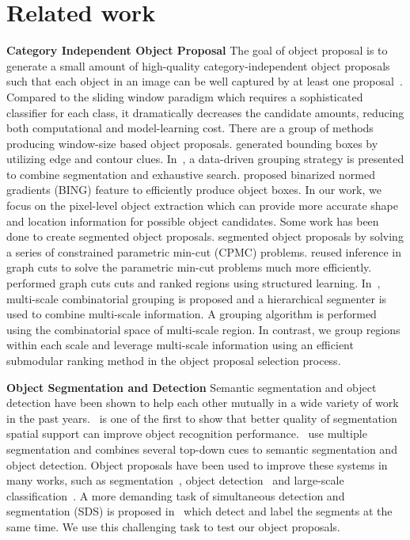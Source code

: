 \documentclass[10pt,twocolumn,letterpaper]{article}
\begin{document}
\section{Related work}
{\bf Category Independent Object Proposal} The goal of object proposal is to generate a small amount of high-quality category-independent object proposals such that each object in an image can be well captured by at least one proposal~\cite{Alexe12, Endres14}. Compared to the sliding window paradigm which requires a sophisticated classifier for each class, it dramatically decreases the candidate amounts, reducing both computational and model-learning cost. There are a group of methods producing window-size based object proposals. \cite{Zitnick14} generated bounding boxes by utilizing edge and contour clues. In~\cite{Uijlings13}, a data-driven grouping strategy is presented to combine segmentation and exhaustive search. \cite{Cheng14} proposed binarized normed gradients (BING) feature to efficiently produce object boxes. In our work, we focus on the pixel-level object extraction which can provide more accurate shape and location information for possible object candidates. Some work has been done to create segmented object proposals. \cite{Carreira12} segmented object proposals by solving a series of constrained parametric min-cut (CPMC) problems. \cite{Humayun14} reused inference in graph cuts to solve the parametric min-cut problems much more efficiently. \cite{Endres14} performed graph cuts cuts and ranked regions using structured learning. In~\cite{Arbelaez14}, multi-scale combinatorial grouping is proposed and a hierarchical segmenter is used to combine multi-scale information. A grouping algorithm is performed using the combinatorial space of multi-scale region. In contrast, we group regions within each scale and leverage multi-scale information using an efficient submodular ranking method in the object proposal selection process. 

{\bf Object Segmentation and Detection} Semantic segmentation and object detection have been shown to help each other mutually in a wide variety of work in the past years.~\cite{malisiewicz-bmvc07} is one of the first to show that better quality of segmentation spatial support can improve object recognition performance.~\cite{Fidler13, Chen11, Hariharan14} use multiple segmentation and combines several top-down cues to  semantic segmentation and object detection. Object proposals have been used to improve these systems in many works, such as segmentation~\cite{Arbelaez12, Carreira12}, object detection~\cite{Fidler13} and large-scale classification~\cite{Uijlings13}. A more demanding task of simultaneous detection and segmentation (SDS) is proposed in~\cite{Hariharan14} which detect and label the segments at the same time. We use this challenging task to test our object proposals. 
\end{document}
